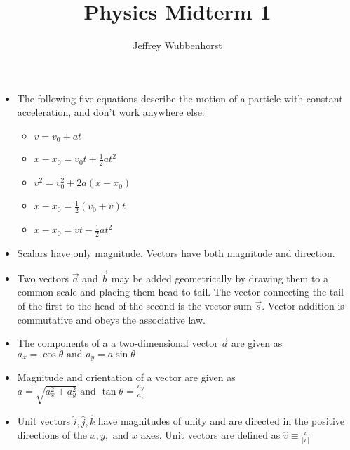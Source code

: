 \documentclass[10pt,letterpaper]{article}
\author{Jeffrey Wubbenhorst}
\title{Physics Midterm 1}
\begin{document}
\maketitle



\begin{itemize}


\item 
The following five equations describe the motion of a particle with constant acceleration, and don't work anywhere else: 
\begin{itemize}
\item $v=v_0+at$ 
\item $x-x_0=v_0t+\frac{1}{2}at^2$ 
\item $v^2=v_0^2+2a(x-x_0)$ 
\item $x-x_0=\frac{1}{2}(v_0+v)t$ 
\item $x-x_0=vt-\frac{1}{2}at^2$

\end{itemize}


\item Scalars have only magnitude. Vectors have both magnitude and direction. 

\item Two vectors $\vec{a}$ and $\vec{b}$ may be added geometrically by drawing them to a common scale and placing them head to tail. The vector connecting the tail of the first to the head of the second is the vector sum $\vec{s}$. Vector addition is commutative and obeys the associative law. 

\item The components of a a two-dimensional vector $\vec{a}$ are given as $a_x=\cos \theta \mbox{ and } a_y=a\sin \theta$ 

\item Magnitude and orientation of a vector are given as $a=\sqrt{a_x^2+a_y^2} \mbox{ and } \tan \theta=\frac{a_y}{a_x}$

\item Unit vectors $\hat{i},\hat{j},\hat{k}$ have magnitudes of unity and are directed in the positive directions of the $x,y,\mbox{ and } x$ axes. Unit vectors are defined as $\hat{v}\equiv \frac{v}{|v|}$



\end{itemize}
\end{document}

